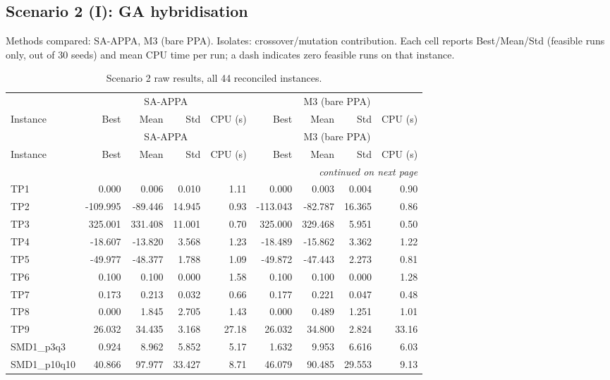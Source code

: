 \subsection{Scenario 2 (I): GA hybridisation}
\label{app:scenario2}
Methods compared: SA-APPA, M3 (bare PPA). Isolates: crossover/mutation contribution. Each cell reports Best/Mean/Std (feasible runs only, out of 30 seeds) and mean CPU time per run; a dash indicates zero feasible runs on that instance.

\begingroup\scriptsize
\begin{longtable}{lrrrrrrrr}
\caption{Scenario 2 raw results, all 44 reconciled instances.}\label{tab:scenario2}\\
\toprule
 & \multicolumn{4}{c}{SA-APPA} & \multicolumn{4}{c}{M3 (bare PPA)} \\
\cmidrule(lr){2-5} \cmidrule(lr){6-9}
Instance & Best & Mean & Std & CPU (s) & Best & Mean & Std & CPU (s) \\
\midrule
\endfirsthead
\toprule
 & \multicolumn{4}{c}{SA-APPA} & \multicolumn{4}{c}{M3 (bare PPA)} \\
\cmidrule(lr){2-5} \cmidrule(lr){6-9}
Instance & Best & Mean & Std & CPU (s) & Best & Mean & Std & CPU (s) \\
\midrule
\endhead
\midrule\multicolumn{9}{r}{\emph{continued on next page}}\\\midrule
\endfoot
\bottomrule
\endlastfoot
TP1 & 0.000 & 0.006 & 0.010 & 1.11 & 0.000 & 0.003 & 0.004 & 0.90 \\
TP2 & -109.995 & -89.446 & 14.945 & 0.93 & -113.043 & -82.787 & 16.365 & 0.86 \\
TP3 & 325.001 & 331.408 & 11.001 & 0.70 & 325.000 & 329.468 & 5.951 & 0.50 \\
TP4 & -18.607 & -13.820 & 3.568 & 1.23 & -18.489 & -15.862 & 3.362 & 1.22 \\
TP5 & -49.977 & -48.377 & 1.788 & 1.09 & -49.872 & -47.443 & 2.273 & 0.81 \\
TP6 & 0.100 & 0.100 & 0.000 & 1.58 & 0.100 & 0.100 & 0.000 & 1.28 \\
TP7 & 0.173 & 0.213 & 0.032 & 0.66 & 0.177 & 0.221 & 0.047 & 0.48 \\
TP8 & 0.000 & 1.845 & 2.705 & 1.43 & 0.000 & 0.489 & 1.251 & 1.01 \\
TP9 & 26.032 & 34.435 & 3.168 & 27.18 & 26.032 & 34.800 & 2.824 & 33.16 \\
SMD1\_p3q3 & 0.924 & 8.962 & 5.852 & 5.17 & 1.632 & 9.953 & 6.616 & 6.03 \\
SMD1\_p10q10 & 40.866 & 97.977 & 33.427 & 8.71 & 46.079 & 90.485 & 29.553 & 9.13 \\

\end{longtable}
